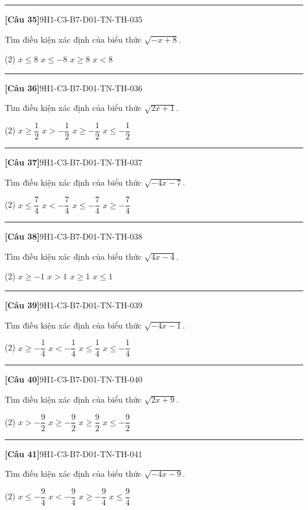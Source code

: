 \documentclass[12pt,a4paper]{article}
\newif\ifloigiai
\newenvironment{cauhoi}[2]{%
  \par\medskip\noindent\rule{\textwidth}{0.4pt}\par\nopagebreak
  \noindent\textbf{[#1]}\hfill{\scriptsize\ttfamily #2}\par\nopagebreak\smallskip}{\par}
\newcommand{\dapan}[1]{\ifloigiai\par\smallskip\noindent\textit{Đáp án:} \textbf{#1}\par\fi}
\begin{document}
\begin{cauhoi}{Câu 35}{9H1-C3-B7-D01-TN-TH-035}
Tìm điều kiện xác định của biểu thức $\sqrt{-x + 8}$.
\begin{tasks}(2)
\task $x\le 8$
\task $x\le -8$
\task $x\ge 8$
\task $x<8$
\end{tasks}
\dapan{A}
\end{cauhoi}
\begin{cauhoi}{Câu 36}{9H1-C3-B7-D01-TN-TH-036}
Tìm điều kiện xác định của biểu thức $\sqrt{2x + 1}$.
\begin{tasks}(2)
\task $x\ge \dfrac{1}{2}$
\task $x>-\dfrac{1}{2}$
\task $x\ge -\dfrac{1}{2}$
\task $x\le -\dfrac{1}{2}$
\end{tasks}
\dapan{C}
\end{cauhoi}
\begin{cauhoi}{Câu 37}{9H1-C3-B7-D01-TN-TH-037}
Tìm điều kiện xác định của biểu thức $\sqrt{-4x - 7}$.
\begin{tasks}(2)
\task $x\le \dfrac{7}{4}$
\task $x<-\dfrac{7}{4}$
\task $x\le -\dfrac{7}{4}$
\task $x\ge -\dfrac{7}{4}$
\end{tasks}
\dapan{C}
\end{cauhoi}
\begin{cauhoi}{Câu 38}{9H1-C3-B7-D01-TN-TH-038}
Tìm điều kiện xác định của biểu thức $\sqrt{4x - 4}$.
\begin{tasks}(2)
\task $x\ge -1$
\task $x>1$
\task $x\ge 1$
\task $x\le 1$
\end{tasks}
\dapan{C}
\end{cauhoi}
\begin{cauhoi}{Câu 39}{9H1-C3-B7-D01-TN-TH-039}
Tìm điều kiện xác định của biểu thức $\sqrt{-4x - 1}$.
\begin{tasks}(2)
\task $x\ge -\dfrac{1}{4}$
\task $x<-\dfrac{1}{4}$
\task $x\le \dfrac{1}{4}$
\task $x\le -\dfrac{1}{4}$
\end{tasks}
\dapan{D}
\end{cauhoi}
\begin{cauhoi}{Câu 40}{9H1-C3-B7-D01-TN-TH-040}
Tìm điều kiện xác định của biểu thức $\sqrt{2x + 9}$.
\begin{tasks}(2)
\task $x>-\dfrac{9}{2}$
\task $x\ge -\dfrac{9}{2}$
\task $x\ge \dfrac{9}{2}$
\task $x\le -\dfrac{9}{2}$
\end{tasks}
\dapan{B}
\end{cauhoi}
\begin{cauhoi}{Câu 41}{9H1-C3-B7-D01-TN-TH-041}
Tìm điều kiện xác định của biểu thức $\sqrt{-4x - 9}$.
\begin{tasks}(2)
\task $x\le -\dfrac{9}{4}$
\task $x<-\dfrac{9}{4}$
\task $x\ge -\dfrac{9}{4}$
\task $x\le \dfrac{9}{4}$
\end{tasks}
\dapan{A}
\end{cauhoi}
\end{document}
